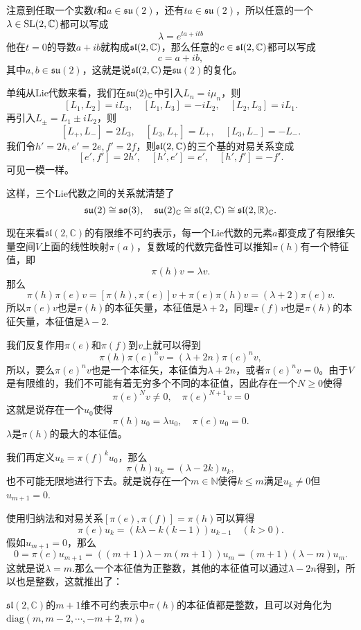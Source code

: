 注意到任取一个实数$t$和$a\in\mathfrak{su}(2)$，还有$ta \in\mathfrak{su}(2)$，所以任意的一个$\lambda \in \mathrm{SL}(2,\mathbb{C})$都可以写成
\[
\lambda=e^{ta+itb}
\]
他在$t=0$的导数$a+ib$就构成$\mathfrak{sl}(2,\mathbb{C})$，那么任意的$c\in \mathfrak{sl}(2,\mathbb{C})$都可以写成
\[
c=a+ib,
\]
其中$a,b\in\mathfrak{su}(2)$，这就是说$\mathfrak{sl}(2,\mathbb{C})$是$\mathfrak{su}(2)$的复化。

单纯从Lie代数来看，我们在$\mathfrak{su}(2)_{\mathbb{C}}$中引入$L_n=i\mu_n$，则
\[
	[L_1,L_2]=iL_3,\quad [L_1,L_3]=-iL_2,\quad [L_2,L_3]=iL_1.
\]
再引入$L_\pm=L_1\pm iL_2$，则
\[
	[L_+,L_-]=2L_3,\quad [L_3,L_+]=L_+,\quad [L_3,L_-]=-L_-.
\]
我们令$h'=2h,e'=2e,f'=2f$，则$\mathfrak{sl}(2,\mathbb{C})$的三个基的对易关系变成
\[
[e',f']=2h',\quad[h',e']=e',\quad[h',f']=-f'.
\]
可见一模一样。

这样，三个Lie代数之间的关系就清楚了
\[
	\mathfrak{su}(2)\cong\mathfrak{so}(3),\quad \mathfrak{su}(2)_{\mathbb{C}}\cong \mathfrak{sl}(2,\mathbb{C}) \cong\mathfrak{sl}(2,\mathbb{R})_{\mathbb{C}}.
\]

现在来看$\mathfrak{sl}(2,\mathbb{C})$的有限维不可约表示，每一个Lie代数的元素$a$都变成了有限维矢量空间$V$上面的线性映射$\pi(a)$，复数域的代数完备性可以推知$\pi(h)$有一个特征值，即
\[
	\pi(h)v=\lambda v.
\]
那么
\[
	\pi(h)\pi(e)v=[\pi(h),\pi(e)]v+\pi(e)\pi(h)v=(\lambda+2)\pi(e)v.
\]
所以$\pi(e)v$也是$\pi(h)$的本征矢量，本征值是$\lambda+2$，同理$\pi(f)v$也是$\pi(h)$的本征矢量，本征值是$\lambda-2$.

我们反复作用$\pi(e)$和$\pi(f)$到$v$上就可以得到
\[
	\pi(h)\pi(e)^nv=(\lambda+2n)\pi(e)^nv,
\]
所以，要么$\pi(e)^nv$也是一个本征矢，本征值为$\lambda+2n$，或者$\pi(e)^nv=0$。由于$V$是有限维的，我们不可能有着无穷多个不同的本征值，因此存在一个$N\geq 0$使得
\[
	\pi(e)^Nv\neq 0,\quad \pi(e)^{N+1}v=0
\]
这就是说存在一个$u_0$使得
\[
	\pi(h)u_0=\lambda u_0,\quad \pi(e)u_0=0.
\]
$\lambda$是$\pi(h)$的最大的本征值。

我们再定义$u_k=\pi(f)^ku_0$，那么
\[
	\pi(h)u_k=(\lambda-2k) u_k,
\]
也不可能无限地进行下去。就是说存在一个$m\in \mathbb{N}$使得$k\leq m$满足$u_k\neq 0$但$u_{m+1}=0$.

使用归纳法和对易关系$[\pi(e),\pi(f)]=\pi(h)$可以算得
\[
\pi(e)u_k=(k\lambda -k(k-1)) u_{k-1}\quad (k>0).
\]
假如$u_{m+1}=0$，那么
\[
0=\pi(e)u_{m+1}=((m+1)\lambda -m(m+1)) u_{m}=(m+1)(\lambda-m)u_{m}.
\]
这就是说$\lambda=m$.那么一个本征值为正整数，其他的本征值可以通过$\lambda-2n$得到，所以也是整数，这就推出了：

\pro
$\mathfrak{sl}(2,\mathbb{C})$的$m+1$维不可约表示中$\pi(h)$的本征值都是整数，且可以对角化为$\mathrm{diag}(m,m-2,\cdots,-m+2,m)$。

